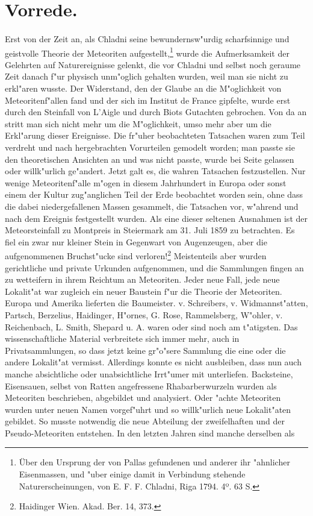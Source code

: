 \documentclass[a4paper, 11pt, oneside]{article}
\begin{document}
\setlength{\parskip}{1mm plus1mm minus1mm}
\clearpage
\tableofcontents
\clearpage
\section*{Vorrede.}
\paragraph{}
Erst von der Zeit an, als Chladni seine bewundernsw"urdig scharfsinnige und geistvolle Theorie der Meteoriten aufgestellt,\footnote{Über den Ursprung der von Pallas gefundenen und anderer ihr "ahnlicher Eisenmassen, und "uber einige damit in Verbindung stehende Naturerscheinungen, von E. F. F. Chladni, Riga 1794. 4º. 63 S.} wurde die Aufmerksamkeit der Gelehrten auf Naturereignisse gelenkt, die vor Chladni und selbst noch geraume Zeit danach f"ur physisch unm"oglich gehalten wurden, weil man sie nicht zu erkl"aren wusste. Der Widerstand, den der Glaube an die M"oglichkeit von Meteoritenf"allen fand und der sich im Institut de France gipfelte, wurde erst durch den Steinfall von L'Aigle und durch Biots Gutachten gebrochen. Von da an stritt man sich nicht mehr um die M"oglichkeit, umso mehr aber um die Erkl"arung dieser Ereignisse. Die fr"uher beobachteten Tatsachen waren zum Teil verdreht und nach hergebrachten Vorurteilen gemodelt worden; man passte sie den theoretischen Ansichten an und was nicht passte, wurde bei Seite gelassen oder willk"urlich ge"andert. Jetzt galt es, die wahren Tatsachen festzustellen. Nur wenige Meteoritenf"alle m"ogen in diesem Jahrhundert in Europa oder sonst einem der Kultur zug"anglichen Teil der Erde beobachtet worden sein, ohne dass die dabei niedergefallenen Massen gesammelt, die Tatsachen vor, w"ahrend und nach dem Ereignis festgestellt wurden. Als eine dieser seltenen Ausnahmen ist der Meteorsteinfall zu Montpreis in Steiermark am 31. Juli 1859 zu betrachten. Es fiel ein zwar nur kleiner Stein in Gegenwart von Augenzeugen, aber die aufgenommenen Bruchst"ucke sind verloren!\footnote{Haidinger Wien. Akad. Ber. 14, 373.} Meistenteils aber wurden gerichtliche und private Urkunden aufgenommen, und die Sammlungen fingen an zu wetteifern in ihrem Reichtum an Meteoriten. Jeder neue Fall, jede neue Lokalit"at war zugleich ein neuer Baustein f"ur die Theorie der Meteoriten. Europa und Amerika lieferten die Baumeister. v. Schreibers, v. Widmannst"atten, Partsch, Berzelius, Haidinger, H"ornes, G. Rose, Rammelsberg, W"ohler, v. Reichenbach, L. Smith, Shepard u. A. waren oder sind noch am t"atigsten. Das wissenschaftliche Material verbreitete sich immer mehr, auch in Privatsammlungen, so dass jetzt keine gr"o"sere Sammlung die eine oder die andere Lokalit"at vermisst. Allerdings konnte es nicht ausbleiben, dass nun auch manche absichtliche oder unabsichtliche Irrt"umer mit unterliefen. Backsteine, Eisensauen, selbst von Ratten angefressene Rhabarberwurzeln wurden als Meteoriten beschrieben, abgebildet und analysiert. Oder "achte Meteoriten wurden unter neuen Namen vorgef"uhrt und so willk"urlich neue Lokalit"aten gebildet. So musste notwendig die neue Abteilung der zweifelhaften und der Pseudo-Meteoriten entstehen. In den letzten Jahren sind manche derselben als 
\end{document}
